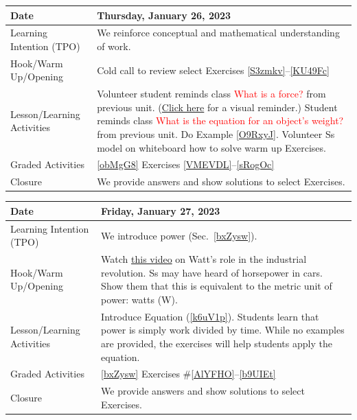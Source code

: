 \documentclass{article}
\numberwithin{equation}{section}
\numberwithin{figure}{section}
\begin{document}
\begin{tabular}{|m{}|m{}|}
    \hline  
    \cellcolor{black!20}\textbf{Date} &
    \cellcolor{black!20}\textbf{Thursday, January 26, 2023} \\
    \hline
    Learning Intention (TPO) &  We reinforce conceptual and mathematical understanding of work.\\
    \hline
    Hook/Warm Up/Opening & Cold call to review select Exercises \ref{S3zmkv}--\ref{KU49Fc}\\
    \hline
    Lesson/Learning Activities & Volunteer student reminds class \textcolor{red}{What is a force?} from previous unit. (\href{https://phet.colorado.edu/en/simulations/forces-and-motion-basics}{Click here} for a visual reminder.) Student reminds class \textcolor{red}{What is the equation for an object's weight?} from previous unit. Do Example \ref{O9RxyJ}. Volunteer Ss model on whiteboard how to solve warm up Exercises.\\
    \hline
    Graded Activities & \ref{obMgG8} Exercises \ref{VMEVDL}--\ref{sRogOc} \\
    \hline
    Closure & We provide answers and show solutions to select Exercises.\\  
    \hline
\end{tabular} 

\begin{tabular}{|m{}|m{}|}
    \hline  
    \cellcolor{black!20}\textbf{Date} &
    \cellcolor{black!20}\textbf{Friday, January 27, 2023} \\
    \hline
    Learning Intention (TPO) & We introduce \gls{power} (Sec.~\ref{bxZysw}). \\
    \hline
    Hook/Warm Up/Opening & Watch \href{https://youtu.be/zhL5DCizj5c}{this video} on Watt's role in the industrial revolution. Ss may have heard of horsepower in cars. Show them that this is equivalent to the metric unit of power: watts (W). \\
    \hline
    Lesson/Learning Activities & Introduce Equation (\ref{k6uV1p}). Students learn that power is simply work divided by time. While no examples are provided, the exercises will help students apply the equation.\\
    \hline
    Graded Activities & \ref{bxZysw} Exercises \#\ref{AlYFHO}--\ref{b9UIEt} \\
    \hline
    Closure & We provide answers and show solutions to select Exercises.\\  
    \hline
\end{tabular}
\end{document}
